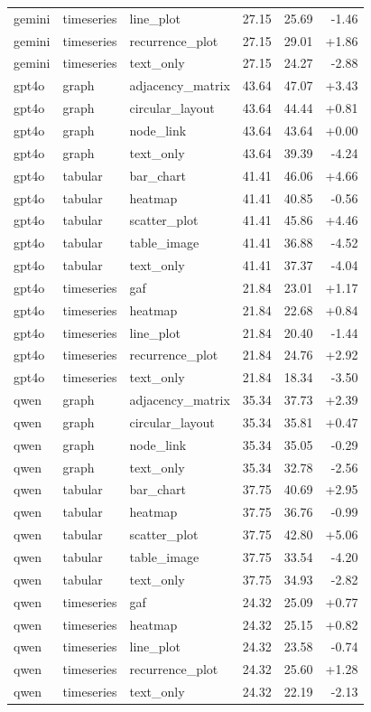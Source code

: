 \begin{tabular}{lllrrr}
gemini & timeseries & line\_plot & 27.15 & 25.69 & -1.46 \\
gemini & timeseries & recurrence\_plot & 27.15 & 29.01 & +1.86 \\
gemini & timeseries & text\_only & 27.15 & 24.27 & -2.88 \\
gpt4o & graph & adjacency\_matrix & 43.64 & 47.07 & +3.43 \\
gpt4o & graph & circular\_layout & 43.64 & 44.44 & +0.81 \\
gpt4o & graph & node\_link & 43.64 & 43.64 & +0.00 \\
gpt4o & graph & text\_only & 43.64 & 39.39 & -4.24 \\
gpt4o & tabular & bar\_chart & 41.41 & 46.06 & +4.66 \\
gpt4o & tabular & heatmap & 41.41 & 40.85 & -0.56 \\
gpt4o & tabular & scatter\_plot & 41.41 & 45.86 & +4.46 \\
gpt4o & tabular & table\_image & 41.41 & 36.88 & -4.52 \\
gpt4o & tabular & text\_only & 41.41 & 37.37 & -4.04 \\
gpt4o & timeseries & gaf & 21.84 & 23.01 & +1.17 \\
gpt4o & timeseries & heatmap & 21.84 & 22.68 & +0.84 \\
gpt4o & timeseries & line\_plot & 21.84 & 20.40 & -1.44 \\
gpt4o & timeseries & recurrence\_plot & 21.84 & 24.76 & +2.92 \\
gpt4o & timeseries & text\_only & 21.84 & 18.34 & -3.50 \\
qwen & graph & adjacency\_matrix & 35.34 & 37.73 & +2.39 \\
qwen & graph & circular\_layout & 35.34 & 35.81 & +0.47 \\
qwen & graph & node\_link & 35.34 & 35.05 & -0.29 \\
qwen & graph & text\_only & 35.34 & 32.78 & -2.56 \\
qwen & tabular & bar\_chart & 37.75 & 40.69 & +2.95 \\
qwen & tabular & heatmap & 37.75 & 36.76 & -0.99 \\
qwen & tabular & scatter\_plot & 37.75 & 42.80 & +5.06 \\
qwen & tabular & table\_image & 37.75 & 33.54 & -4.20 \\
qwen & tabular & text\_only & 37.75 & 34.93 & -2.82 \\
qwen & timeseries & gaf & 24.32 & 25.09 & +0.77 \\
qwen & timeseries & heatmap & 24.32 & 25.15 & +0.82 \\
qwen & timeseries & line\_plot & 24.32 & 23.58 & -0.74 \\
qwen & timeseries & recurrence\_plot & 24.32 & 25.60 & +1.28 \\
qwen & timeseries & text\_only & 24.32 & 22.19 & -2.13 \\
\bottomrule
\end{tabular}
